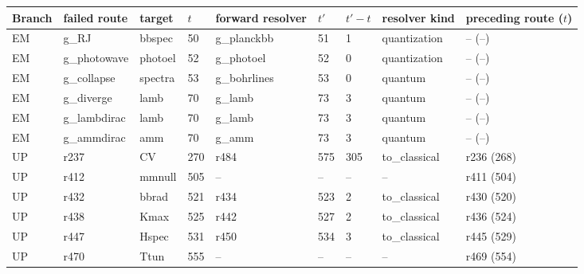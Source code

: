 \begin{tabular}{@{}lllllllll@{}}\toprule
Branch & failed route & target & $t$ & forward resolver & $t'$ & $t'-t$ & resolver kind & preceding route ($t$) \\\midrule
EM & g\_RJ & bbspec & 50 & g\_planckbb & 51 & 1 & quantization & -- (--) \\
EM & g\_photowave & photoel & 52 & g\_photoel & 52 & 0 & quantization & -- (--) \\
EM & g\_collapse & spectra & 53 & g\_bohrlines & 53 & 0 & quantum & -- (--) \\
EM & g\_diverge & lamb & 70 & g\_lamb & 73 & 3 & quantum & -- (--) \\
EM & g\_lambdirac & lamb & 70 & g\_lamb & 73 & 3 & quantum & -- (--) \\
EM & g\_ammdirac & amm & 70 & g\_amm & 73 & 3 & quantum & -- (--) \\
UP & r237 & CV & 270 & r484 & 575 & 305 & to\_classical & r236 (268) \\
UP & r412 & mmnull & 505 & -- & -- & -- & -- & r411 (504) \\
UP & r432 & bbrad & 521 & r434 & 523 & 2 & to\_classical & r430 (520) \\
UP & r438 & Kmax & 525 & r442 & 527 & 2 & to\_classical & r436 (524) \\
UP & r447 & Hspec & 531 & r450 & 534 & 3 & to\_classical & r445 (529) \\
UP & r470 & Ttun & 555 & -- & -- & -- & -- & r469 (554) \\
\bottomrule\end{tabular}
